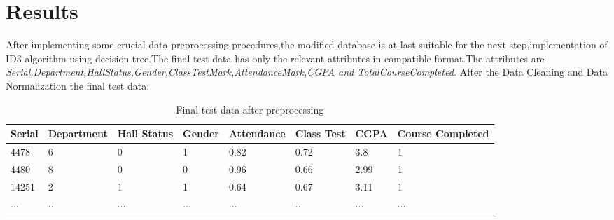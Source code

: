 \documentclass[a4paper,12pt]{book}
\begin{document}
\section{Results}
After implementing some crucial data preprocessing procedures,the modified database is at last suitable for the next step,implementation of ID3 algorithm using decision tree.The final test data has only the relevant attributes in compatible format.The attributes are \textit{Serial,Department,HallStatus,Gender,}\newline \textit{ClassTestMark,AttendanceMark,CGPA and TotalCourseCompleted.} \newline
After the Data Cleaning and Data Normalization the final test data:
\begin {table}[H]
\caption {Final test data after preprocessing} \label{tab:title} 
\begin{center}
\begin{tabular}{ | m{0.8cm} |  m{2cm} | m{1cm} | m{1.1cm} | m{1.9cm} | m{0.8cm} | m{1cm} |m{1.8cm} | } 
\hline
Serial & Department &  Hall \newline Status & Gender & Attendance & Class \newline Test & CGPA & Course \newline Completed \\ 
\hline
4478 & 6 & 0 & 1 & 0.82 & 0.72 & 3.8 & 1 \\ 
\hline
4480 & 8 & 0 & 0 & 0.96 & 0.66 & 2.99 & 1 \\ 
\hline
14251 & 2 & 1 & 1 & 0.64 & 0.67 & 3.11 & 1 \\ 
\hline
... & ... & ... & ... & ... & ... & ... & ... \\ 
\hline
\end{tabular}
\end{center}
\end{table}
\end{document}
